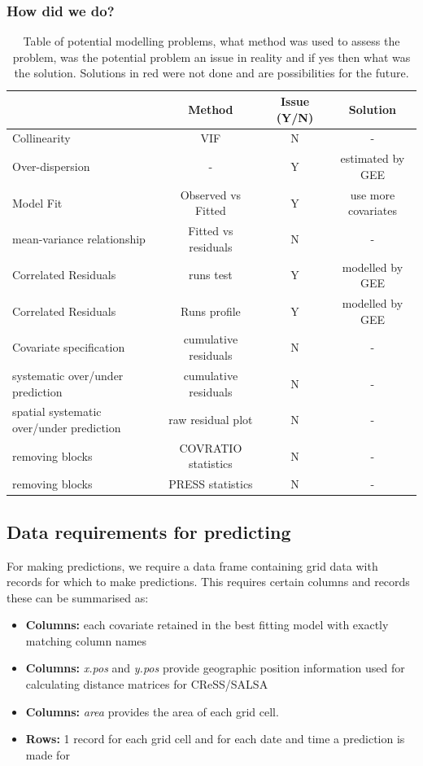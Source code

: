 \clearpage
\begin{frame}
\frametitle{How did we do?}
\begin{table}[h]
\centering
\scriptsize
\caption{Table of potential modelling problems, what method was used to assess the problem, was the potential problem an issue in reality and if yes then what was the solution.  Solutions in red were not done and are possibilities for the future.}
\begin{tabular}{l|c|c|c}
\textbf{} & \textbf{Method} & \textbf{Issue (Y/N)} & \textbf{Solution}\\
\hline
Collinearity & VIF & N & -\\
Over-dispersion& - & Y & estimated by GEE\\
Model Fit & Observed vs Fitted & Y & {\color{red} use more covariates}\\
mean-variance relationship & Fitted vs residuals & N & -\\
Correlated Residuals & runs test & Y & modelled by GEE\\
Correlated Residuals & Runs profile & Y & modelled by GEE\\
Covariate specification & cumulative residuals & N & -\\
systematic over/under prediction & cumulative residuals & N & -\\
spatial systematic over/under prediction & raw residual plot & N & -\\
removing blocks & COVRATIO statistics & N & - \\
removing blocks & PRESS statistics & N & - \\

\end{tabular}
\label{tab:fitstats}
\end{table}

\end{frame}

\label{sec:nspreds}

\subsection{Data requirements for predicting}
For making predictions, we require a data frame containing grid data with records for which to make predictions. This requires certain columns and records these can be summarised as:\\
\large
\begin{itemize}
\item{\textbf{Columns:} each covariate retained in the best fitting model with exactly matching column names}
\item{\textbf{Columns:} \textit{x.pos} and \textit{y.pos} provide geographic position information used for calculating distance matrices for CReSS/SALSA}
\item{\textbf{Columns:} \textit{area} provides the area of each grid cell. }
\item{\textbf{Rows:} 1 record for each grid cell and for each date and time a prediction is made for}
\end{itemize}

